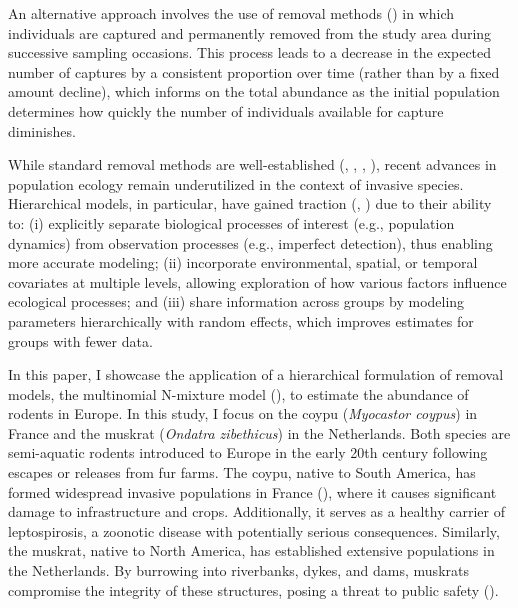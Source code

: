 \documentclass[
  11pt,
  a4paper,
]{article}
\begin{document}
An alternative approach involves the use of removal methods () in which individuals are captured and permanently removed from the study area during successive sampling occasions. This process leads to a decrease in the expected number of captures by a consistent proportion over time (rather than by a fixed amount decline), which informs on the total abundance as the initial population determines how quickly the number of individuals available for capture diminishes.

While standard removal methods are well-established (, , , ), recent advances in population ecology remain underutilized in the context of invasive species. Hierarchical models, in particular, have gained traction (, ) due to their ability to: (i) explicitly separate biological processes of interest (e.g., population dynamics) from observation processes (e.g., imperfect detection), thus enabling more accurate modeling; (ii) incorporate environmental, spatial, or temporal covariates at multiple levels, allowing exploration of how various factors influence ecological processes; and (iii) share information across groups by modeling parameters hierarchically with random effects, which improves estimates for groups with fewer data.

In this paper, I showcase the application of a hierarchical formulation of removal models, the multinomial N-mixture model (), to estimate the abundance of rodents in Europe. In this study, I focus on the coypu (\emph{Myocastor coypus}) in France and the muskrat (\emph{Ondatra zibethicus}) in the Netherlands. Both species are semi-aquatic rodents introduced to Europe in the early 20th century following escapes or releases from fur farms. The coypu, native to South America, has formed widespread invasive populations in France (), where it causes significant damage to infrastructure and crops. Additionally, it serves as a healthy carrier of leptospirosis, a zoonotic disease with potentially serious consequences. Similarly, the muskrat, native to North America, has established extensive populations in the Netherlands. By burrowing into riverbanks, dykes, and dams, muskrats compromise the integrity of these structures, posing a threat to public safety ().
\end{document}
